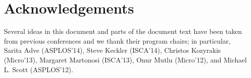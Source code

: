 \documentclass[pageno]{jpaper}
\begin{document}
\section{Acknowledgements}
Several ideas in this document and parts of the document text have been
taken from previous conferences and we thank their program chairs;
in particular, Sarita Adve (ASPLOS'14), Steve Keckler (ISCA'14), 
Christos Kozyrakis (Micro'13), Margaret Martonosi (ISCA'13),
Onur Mutlu (Micro'12), and Michael L. Scott (ASPLOS'12).




	
	
\end{document}
